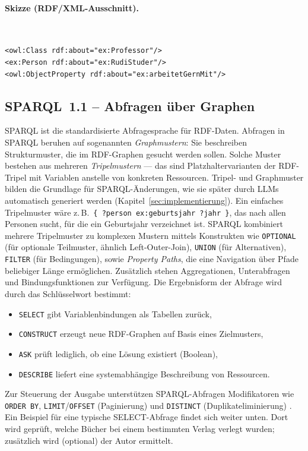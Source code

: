 \paragraph{Skizze (RDF/XML-Ausschnitt).}\mbox{}\\[-1.5ex]
\begin{lstlisting}
<owl:Class rdf:about="ex:Professor"/>
<ex:Person rdf:about="ex:RudiStuder"/>
<owl:ObjectProperty rdf:about="ex:arbeitetGernMit"/>
\end{lstlisting}

\subsection{SPARQL~1.1 -- Abfragen über Graphen}
\label{subsec:sparql}

SPARQL ist die standardisierte Abfragesprache für RDF-Daten. Abfragen in SPARQL beruhen auf sogenannten \emph{Graphmustern}: Sie beschreiben Strukturmuster, die im RDF-Graphen gesucht werden sollen. Solche Muster bestehen aus mehreren \emph{Tripelmustern} — das sind Platzhaltervarianten der RDF-Tripel mit Variablen anstelle von konkreten Ressourcen. Tripel- und Graphmuster bilden die Grundlage für SPARQL-Änderungen, wie sie später durch LLMs automatisch generiert werden (Kapitel~\ref{sec:implementierung}). Ein einfaches Tripelmuster wäre z.\,B.\ \texttt{\{ ?person ex:geburtsjahr ?jahr \}}, das nach allen Personen sucht, für die ein Geburtsjahr verzeichnet ist. SPARQL kombiniert mehrere Tripelmuster zu komplexen Mustern mittels Konstrukten wie \texttt{OPTIONAL} (für optionale Teilmuster, ähnlich Left-Outer-Join), \texttt{UNION} (für Alternativen), \texttt{FILTER} (für Bedingungen), sowie \emph{Property Paths}, die eine Navigation über Pfade beliebiger Länge ermöglichen. Zusätzlich stehen Aggregationen, Unterabfragen und Bindungsfunktionen zur Verfügung.
Die Ergebnisform der Abfrage wird durch das Schlüsselwort bestimmt:
\begin{itemize}
  \item \texttt{SELECT} gibt Variablenbindungen als Tabellen zurück,
  \item \texttt{CONSTRUCT} erzeugt neue RDF-Graphen auf Basis eines Zielmusters,
  \item \texttt{ASK} prüft lediglich, ob eine Lösung existiert (Boolean),
  \item \texttt{DESCRIBE} liefert eine systemabhängige Beschreibung von Ressourcen.
\end{itemize}
Zur Steuerung der Ausgabe unterstützen SPARQL-Abfragen Modifikatoren wie \texttt{ORDER BY}, \texttt{LIMIT}/\texttt{OFFSET} (Paginierung) und \texttt{DISTINCT} (Duplikateliminierung) \cite{SPARQL11Overview,Hitzler,AntoniouVanHarmelen}.
Ein Beispiel für eine typische SELECT-Abfrage findet sich weiter unten. Dort wird geprüft, welche Bücher bei einem bestimmten Verlag verlegt wurden; zusätzlich wird (optional) der Autor ermittelt.


